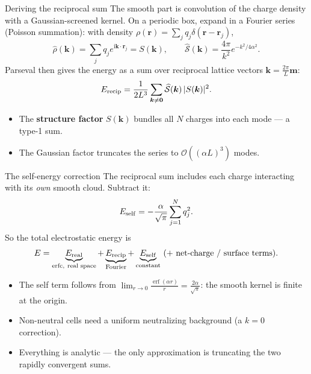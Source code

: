 \documentclass[aspectratio=169,11pt]{beamer}
\newcommand{\cO}{\mathcal{O}}
\newcommand{\ii}{\mathrm i}
\newcommand{\kk}{\bm{k}}
\newcommand{\mm}{\bm{m}}
\newcommand{\rr}{\bm{r}}
\newcommand{\hl}[1]{{\color{CCMorange}\textbf{#1}}}
\DeclareMathOperator{\erf}{erf}
\DeclareMathOperator{\erfc}{erfc}
\begin{document}
\begin{frame}{Deriving the reciprocal sum}
\small
The smooth part is convolution of the charge density with a Gaussian-screened kernel. On a periodic box, expand in a Fourier series (Poisson summation): with density \(\rho(\rr)=\sum_j q_j\delta(\rr-\rr_j)\),
\[
  \widehat\rho(\kk)=\sum_j q_j e^{\ii\kk\cdot\rr_j}=S(\kk),\qquad
  \widehat{\mathcal S}(\kk)=\frac{4\pi}{k^2}e^{-k^2/4\alpha^2}.
\]
Parseval then gives the energy as a sum over reciprocal lattice vectors \(\kk=\tfrac{2\pi}{L}\mm\):
\[
  E_{\rm recip}=\frac{1}{2L^3}\sum_{\kk\neq\bm0}\widehat{\mathcal S}(\kk)\,|S(\kk)|^2 .
\]
\begin{itemize}
  \item The \hl{structure factor} \(S(\kk)\) bundles all \(N\) charges into each mode --- a type-1 sum.
  \item The Gaussian factor truncates the series to \(\cO((\alpha L)^3)\) modes.
\end{itemize}
\end{frame}

\begin{frame}{The self-energy correction}
\small
The reciprocal sum includes each charge interacting with its \emph{own} smooth cloud. Subtract it:
\[
  E_{\rm self}=-\frac{\alpha}{\sqrt\pi}\sum_{j=1}^{N}q_j^2 .
\]
So the total electrostatic energy is
\[
  E=\underbrace{E_{\rm real}}_{\erfc,\ \text{real space}}+\underbrace{E_{\rm recip}}_{\text{Fourier}}+\underbrace{E_{\rm self}}_{\text{constant}}\ (+\ \text{net-charge / surface terms}).
\]
\begin{itemize}
  \item The self term follows from \(\displaystyle \lim_{r\to0}\frac{\erf(\alpha r)}{r}=\frac{2\alpha}{\sqrt\pi}\): the smooth kernel is finite at the origin.
  \item Non-neutral cells need a uniform neutralizing background (a \(k=0\) correction).
  \item Everything is analytic --- the only approximation is truncating the two rapidly convergent sums.
\end{itemize}
\end{frame}
\end{document}
